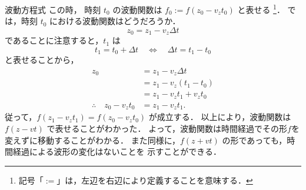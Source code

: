 \begin{memo}{波動方程式}
          この時，
          時刻 $t_{0}$ の波動関数は $f_{0}:=f(z_{0}-v_{z}t_{0})$ と表せる
            \footnote{
                記号「$:=$」は，左辺を右辺により定義することを意味する．
            }．
          では，時刻 $t_{0}$ における波動関数はどうだろうか．
              \begin{equation*}
                  z_{0} = z_{1} - v_{z} \Delta t
              \end{equation*}
          であることに注意すると，$t_{1}$ は
              \begin{equation*}
                  t_{1} = t_{0} + \Delta t
                  \quad \Leftrightarrow \quad
                  \Delta t = t_{1} - t_{0}
              \end{equation*}
          と表せることから，
              \begin{align*}
                  z_{0} &= z_{1} - v_{z} \Delta t            \\
                        &= z_{1} - v_{z} ( t_{1} - t_{0} )   \\
                        &= z_{1} - v_{z}t_{1}  + v_{z}t_{0}  \\
                  \therefore\quad
                  z_{0} -  v_{z}t_{0} &=  z_{1} - v_{z}t_{1}.
              \end{align*}
          従って，$f(z_{1} -  v_{z}t_{1}) = f(z_{0} -  v_{z}t_{0})$ が成立する．
          以上により，波動関数は $f(z-vt)$ で表せることがわかった．
          よって，波動関数は時間経過でその形$f$を変えずに移動することがわかる．
          また同様に，$f(z+vt)$ の形であっても，時間経過による波形の変化はないことを
          示すことができる．
        \end{memo}



